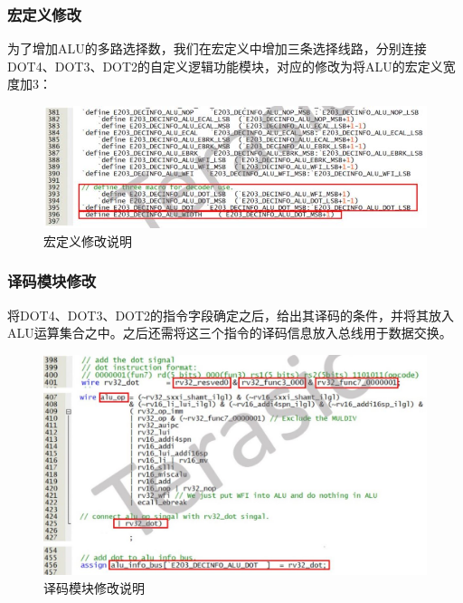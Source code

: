 \documentclass[a4paper, 14pt, oneside]{book} %
\numberwithin{equation}{subsection}
\begin{document}
	\subsubsection{宏定义修改}
	为了增加ALU的多路选择数，我们在宏定义中增加三条选择线路，分别连接DOT4、DOT3、DOT2的自定义逻辑功能模块，对应的修改为将ALU的宏定义宽度加3：
	\begin{figure}[H]
		\centering
		\includegraphics[scale=1]{img/define.jpg}
		\caption{宏定义修改说明}
	\end{figure}
	
	\subsubsection{译码模块修改}
	将DOT4、DOT3、DOT2的指令字段确定之后，给出其译码的条件，并将其放入ALU运算集合之中。之后还需将这三个指令的译码信息放入总线用于数据交换。
	\begin{figure}[H]
		\centering
		\includegraphics[scale=0.7]{img/decode.jpg}
		\caption{译码模块修改说明}
	\end{figure}
	
\end{document}
